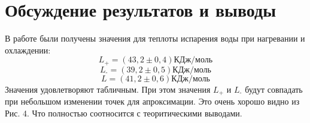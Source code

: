 \documentclass[a4paper,12pt]{article}
\theoremstyle{plain} %
\theoremstyle{definition} %
\theoremstyle{remark} %
\begin{document}
\section{Обсуждение результатов и выводы}
В работе были получены значения для теплоты испарения воды при нагревании и охлаждении:
\[L_\text{+} = (43,2\pm 0,4)\text{КДж}/\text{моль}\]
\[L_\text{-} = (39,2\pm 0,5)\text{КДж}/\text{моль}\]
\[L = (41,2\pm 0,6)\text{КДж}/\text{моль}\]
Значения удовлетворяют табличным. При этом значения $L_\text{+}$ и $L_\text{-}$ будут совпадать при небольшом изменении точек для апроксимации. Это очень хорошо видно из Рис. 4. Что полностью соотносится с теоритическими выводами.
\end{document}
